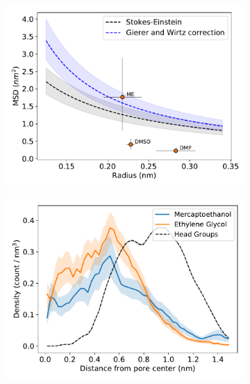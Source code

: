 \documentclass[journal=jpcbfk,manuscript=article]{achemso}
\begin{document}
  \begin{figure}[!htb]
  \centering
  \begin{subfigure}{0.45\linewidth}
  \includegraphics[width=\textwidth]{msd_radius_sulfur_10wt.pdf}
  \caption{}\label{fig:msd_radius_sulfur_10wt}
  \end{subfigure}
  \begin{subfigure}{0.45\linewidth}
  \includegraphics[width=\textwidth]{thiol_comparison_SOH.pdf}
  \caption{}\label{fig:SOH_GCL_comparison}
  \end{subfigure}
  \begin{subfigure}{0.45\linewidth}

\end{subfigure}
\end{figure}
\end{document}
